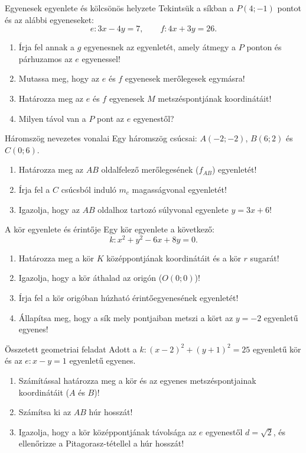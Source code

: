 \documentclass[11pt,a4paper]{article}
\begin{document}
\begin{feladatbox}[10 pont]{Egyenesek egyenlete és kölcsönös helyzete}
Tekintsük a síkban a $P(4; -1)$ pontot és az alábbi egyeneseket:
\[
  e\colon 3x - 4y = 7, \qquad f\colon 4x + 3y = 26.
\]
\begin{enumerate}
  \item Írja fel annak a $g$ egyenesnek az egyenletét, amely átmegy a $P$ ponton és párhuzamos az $e$ egyenessel!
  \item Mutassa meg, hogy az $e$ és $f$ egyenesek merőlegesek egymásra!
  \item Határozza meg az $e$ és $f$ egyenesek $M$ metszéspontjának koordinátáit!
  \item Milyen távol van a $P$ pont az $e$ egyenestől?
\end{enumerate}
\end{feladatbox}

\begin{feladatbox}[10 pont]{Háromszög nevezetes vonalai}
Egy háromszög csúcsai: $A(-2; -2)$, $B(6; 2)$ és $C(0; 6)$.
\begin{enumerate}
  \item Határozza meg az $AB$ oldalfelező merőlegesének ($f_{AB}$) egyenletét!
  \item Írja fel a $C$ csúcsból induló $m_c$ magasságvonal egyenletét!
  \item Igazolja, hogy az $AB$ oldalhoz tartozó súlyvonal egyenlete $y = 3x + 6$!
\end{enumerate}
\end{feladatbox}

\begin{feladatbox}[10 pont]{A kör egyenlete és érintője}
Egy kör egyenlete a következő:
\[
  k\colon x^2 + y^2 - 6x + 8y = 0.
\]
\begin{enumerate}
  \item Határozza meg a kör $K$ középpontjának koordinátáit és a kör $r$ sugarát!
  \item Igazolja, hogy a kör áthalad az origón ($O(0;0)$)!
  \item Írja fel a kör origóban húzható érintőegyenesének egyenletét!
  \item Állapítsa meg, hogy a sík mely pontjaiban metszi a kört az $y = -2$ egyenletű egyenes!
\end{enumerate}
\end{feladatbox}

\begin{feladatbox}[12 pont]{Összetett geometriai feladat}
Adott a $k\colon (x - 2)^2 + (y + 1)^2 = 25$ egyenletű kör és az $e\colon x - y = 1$ egyenletű egyenes.
\begin{enumerate}
  \item Számítással határozza meg a kör és az egyenes metszéspontjainak koordinátáit ($A$ és $B$)!
  \item Számítsa ki az $AB$ húr hosszát!
  \item Igazolja, hogy a kör középpontjának távolsága az $e$ egyenestől $d = \sqrt{2}$, és ellenőrizze a Pitagorasz-tétellel a húr hosszát!
\end{enumerate}
\end{feladatbox}
\end{document}
